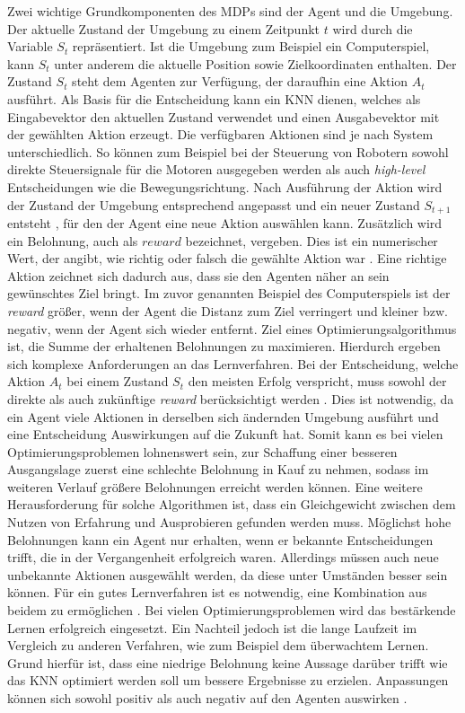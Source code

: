 Zwei wichtige Grundkomponenten des \acp{MDP} sind der Agent und die Umgebung. Der aktuelle Zustand der Umgebung zu einem Zeitpunkt $t$ wird durch die Variable $S_t$ repräsentiert. Ist die Umgebung zum Beispiel ein Computerspiel, kann $S_t$ unter anderem die aktuelle Position sowie Zielkoordinaten enthalten. Der Zustand $S_t$ steht dem Agenten zur Verfügung, der daraufhin eine Aktion $A_t$ ausführt. Als Basis für die Entscheidung kann ein \ac{KNN} dienen, welches als Eingabevektor den aktuellen Zustand verwendet und einen Ausgabevektor mit der gewählten Aktion erzeugt. Die verfügbaren Aktionen sind je nach System unterschiedlich. So können zum Beispiel bei der Steuerung von Robotern sowohl direkte Steuersignale für die Motoren ausgegeben werden als auch \emph{high-level} Entscheidungen wie die Bewegungsrichtung. Nach Ausführung der Aktion wird der Zustand der Umgebung entsprechend angepasst und ein neuer Zustand $S_{t+1}$ entsteht \cite{sutton2018reinforcement}, für den der Agent eine neue Aktion auswählen kann. Zusätzlich wird ein Belohnung, auch als $reward$ bezeichnet, vergeben. Dies ist ein numerischer Wert, der angibt, wie richtig oder falsch die gewählte Aktion war \cite{zell2003simulation}. Eine richtige Aktion zeichnet sich dadurch aus, dass sie den Agenten näher an sein gewünschtes Ziel bringt. Im zuvor genannten Beispiel des Computerspiels ist der \emph{reward} größer, wenn der Agent die Distanz zum Ziel verringert und kleiner bzw. negativ, wenn der Agent sich wieder entfernt. Ziel eines Optimierungsalgorithmus ist, die Summe der erhaltenen Belohnungen zu maximieren. Hierdurch ergeben sich komplexe Anforderungen an das Lernverfahren. Bei der Entscheidung, welche Aktion $A_t$ bei einem Zustand $S_t$ den meisten Erfolg verspricht, muss sowohl der direkte als auch zukünftige \emph{reward} berücksichtigt werden \cite{sutton2018reinforcement}. Dies ist notwendig, da ein Agent viele Aktionen in derselben sich ändernden Umgebung ausführt und eine Entscheidung Auswirkungen auf die Zukunft hat. Somit kann es bei vielen Optimierungsproblemen  lohnenswert sein, zur Schaffung einer besseren Ausgangslage zuerst eine schlechte Belohnung in Kauf zu nehmen, sodass im weiteren Verlauf größere Belohnungen erreicht werden können. Eine weitere Herausforderung für solche Algorithmen ist, dass ein Gleichgewicht zwischen dem Nutzen von Erfahrung und Ausprobieren gefunden werden muss. Möglichst hohe Belohnungen kann ein Agent nur erhalten, wenn er bekannte Entscheidungen trifft, die in der Vergangenheit erfolgreich waren. Allerdings müssen auch neue unbekannte Aktionen ausgewählt werden, da diese unter Umständen besser sein können. Für ein gutes Lernverfahren ist es notwendig, eine Kombination aus beidem zu ermöglichen \cite{sutton2018reinforcement}. Bei vielen Optimierungsproblemen wird das bestärkende Lernen erfolgreich eingesetzt. Ein Nachteil jedoch ist die lange Laufzeit im Vergleich zu anderen Verfahren, wie zum Beispiel dem überwachtem Lernen. Grund hierfür ist, dass eine niedrige Belohnung keine Aussage darüber trifft wie das \ac{KNN} optimiert werden soll um bessere Ergebnisse zu erzielen. Anpassungen können sich sowohl positiv als auch negativ auf den Agenten auswirken \cite{zell2003simulation}. 


